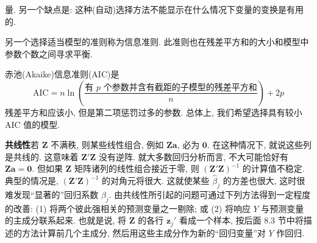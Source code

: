 
量. 另一个缺点是: 这种(自动)选择方法不能显示在什么情况下变量的变换是有用的.

另一个选择适当模型的准则称为信息准则. 此准则也在残差平方和的大小和模型中参数个数之间寻求平衡.

赤池(Akaike)信息准则(AIC)是
\[
\text{AIC}=n\ln\left(\frac{\text{有 }p\text{ 个参数并含有截距的子模型的残差平方和}}{n}\right)+2p
\]
残差平方和应该小, 但是第二项惩罚过多的参数. 总体上, 我们希望选择具有较小 AIC 值的模型.

\noindent\textbf{共线性}\quad 若 $\mathbf{Z}$ 不满秩, 则某些线性组合, 例如 $\mathbf{Z}\mathbf{a}$, 必为 $\mathbf{0}$. 在这种情况下, 就说这些列是共线的. 这意味着 $\mathbf{Z}'\mathbf{Z}$ 没有逆阵. 就大多数回归分析而言, 不大可能恰好有 $\mathbf{Z}\mathbf{a}=\mathbf{0}$. 但如果 $\mathbf{Z}$ 矩阵诸列的线性组合接近于零, 则 $(\mathbf{Z}'\mathbf{Z})^{-1}$ 的计算值不稳定. 典型的情况是, $(\mathbf{Z}'\mathbf{Z})^{-1}$ 的对角元将很大. 这就使某些 $\hat{\beta}_j$ 的方差也很大, 这时很难发现``显著的''回归系数 $\beta_j$. 由共线性所引起的问题可通过下列方法得到一定程度的改善: (1) 将两个彼此强相关的预测变量之一剔除; 或 (2) 将响应 $Y$ 与预测变量的主成分联系起来. 也就是说, 将 $\mathbf{Z}$ 的各行 $\mathbf{z}_j'$ 看成一个样本, 按后面 8.3 节中将描述的方法计算前几个主成分, 然后用这些主成分作为新的``回归变量''对 $Y$ 作回归.

